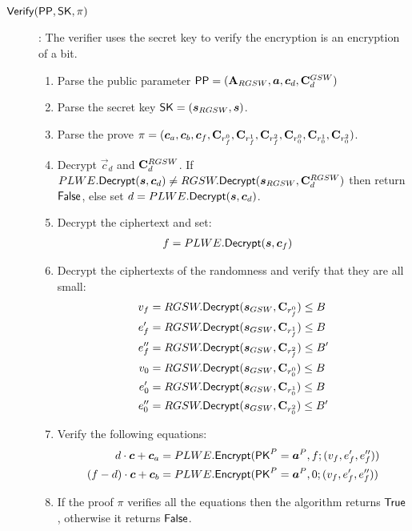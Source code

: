 \begin{description}
\item[${\mathsf{Verify}}({\mathsf{PP}}, \mathsf{SK}, \pi)$]: The verifier uses the secret key to verify the encryption is an encryption of a bit.
  \begin{enumerate}
  \item Parse the public parameter $\PPP = (\mat{A}_{RGSW}, \vec{a}, \vec{c}_d, \mat{C}_d^{GSW})$
  \item Parse the secret key $\SK = (\vec{s}_{RGSW}, \vec{s})$.
  \item Parse the prove $\pi = (\vec{c}_a, \vec{c}_b, \vec{c}_f, \mat{C}_{r_f^0}, \mat{C}_{r_f^1}, \mat{C}_{r_f^2}, \mat{C}_{r_0^0}, \mat{C}_{r_0^1}, \mat{C}_{r_0^2})$.
  \item Decrypt $\vec{c}_d$ and $\mathbf{C}_d^{RGSW}$.
    If $PLWE.\Dec(\vec{s}, \vec{c}_d) \neq RGSW.\Dec(\vec{s}_{RGSW}, \mat{C}_d^{RGSW})$ then return $\mathsf{False}$, else set $d = PLWE.\Dec(\vec{s}, \vec{c}_d)$.
  \item Decrypt the ciphertext and set:
    \begin{align*}
      f &= PLWE.\Dec(\vec{s}, \vec{c}_f)
    \end{align*}
  \item Decrypt the ciphertexts of the randomness and verify that they are all small:
    \begin{align*}
      v_f & = RGSW.\Dec(\vec{s}_{GSW}, \mat{C}_{r_f^0}) \leq B \\
      e_f' & = RGSW.\Dec(\vec{s}_{GSW}, \mat{C}_{r_f^1}) \leq B \\
      e_f'' & = RGSW.\Dec(\vec{s}_{GSW}, \mat{C}_{r_f^2}) \leq B' \\
      v_0 & = RGSW.\Dec(\vec{s}_{GSW}, \mat{C}_{r_0^0}) \leq B \\
      e_0' & = RGSW.\Dec(\vec{s}_{GSW}, \mat{C}_{r_0^1}) \leq B \\
      e_0'' & = RGSW.\Dec(\vec{s}_{GSW}, \mat{C}_{r_0^2}) \leq B' \\
    \end{align*}
  \item Verify the following equations:
    \begin{align*}
      d \cdot \vec{c} + \vec{c}_a &= PLWE.\Enc(\PK^P = \vec{a}^P, f; (v_f, e_f', e_f''))\\
      (f-d) \cdot \vec{c} + \vec{c}_b &= PLWE.\Enc(\PK^P= \vec{a}^P, 0; (v_f, e_f', e_f''))
    \end{align*}
  \item If the proof $\pi$ verifies all the equations then the algorithm returns $\mathsf{True}$, otherwise it returns $\mathsf{False}$.
  \end{enumerate}
  
  
  
\end{description}
